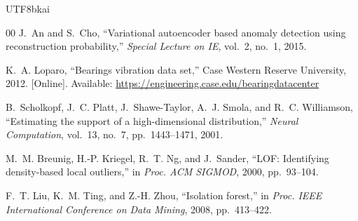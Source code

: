\documentclass[conference]{IEEEtran}
\begin{document}
\begin{CJK}{UTF8}{bkai}
\begin{thebibliography}{00}
J.~An and S.~Cho,
``Variational autoencoder based anomaly detection using reconstruction probability,''
\textit{Special Lecture on IE}, vol.~2, no.~1, 2015.

K.~A. Loparo,
``Bearings vibration data set,'' Case Western Reserve University, 2012.
[Online]. Available: \url{https://engineering.case.edu/bearingdatacenter}

B.~Scholkopf, J.~C. Platt, J.~Shawe-Taylor, A.~J. Smola, and R.~C. Williamson,
``Estimating the support of a high-dimensional distribution,''
\textit{Neural Computation}, vol.~13, no.~7, pp.~1443--1471, 2001.

M.~M. Breunig, H.-P. Kriegel, R.~T. Ng, and J.~Sander,
``LOF: Identifying density-based local outliers,''
in \textit{Proc. ACM SIGMOD}, 2000, pp.~93--104.

F.~T. Liu, K.~M. Ting, and Z.-H. Zhou,
``Isolation forest,''
in \textit{Proc. IEEE International Conference on Data Mining}, 2008, pp.~413--422.

\end{thebibliography}

\end{CJK}
\end{document}
